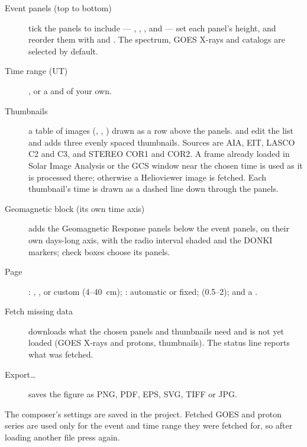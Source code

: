 
\begin{description}
  \item[Event panels (top to bottom)] tick the panels to include --- , , ,  and
     --- set each panel's height, and reorder them with  and
    . The spectrum, GOES X-rays and catalogs are selected by default.
  \item[Time range (UT)] , or a  and  of
    your own.
  \item[Thumbnails] a table of images (, , ) drawn as a row
    above the panels.  and  edit the list and 
    adds three evenly spaced thumbnails. Sources are AIA, EIT, LASCO C2 and C3, and STEREO COR1
    and COR2. A frame already loaded in Solar Image Analysis or the GCS window near the chosen
    time is used as it is processed there; otherwise a Helioviewer image is fetched. Each
    thumbnail's time is drawn as a dashed line down through the panels.
  \item[Geomagnetic block (its own time axis)]  adds the
    Geomagnetic Response panels below the event panels, on their own days-long axis, with the
    radio interval shaded and the DONKI markers; check boxes choose its panels.
  \item[Page] : , \gui{12 cm},  or
    custom (4--40~cm); : automatic or fixed;  (0.5--2); and a
    .
  \item[Fetch missing data] downloads what the chosen panels and thumbnails need and is not yet
    loaded (GOES X-rays and protons, thumbnails). The status line reports what was fetched.
  \item[Export…] saves the figure as PNG, PDF, EPS, SVG, TIFF or JPG.
\end{description}


The composer's settings are saved in the project. Fetched GOES and proton series are used only
for the event and time range they were fetched for, so after loading another file press
 again.
